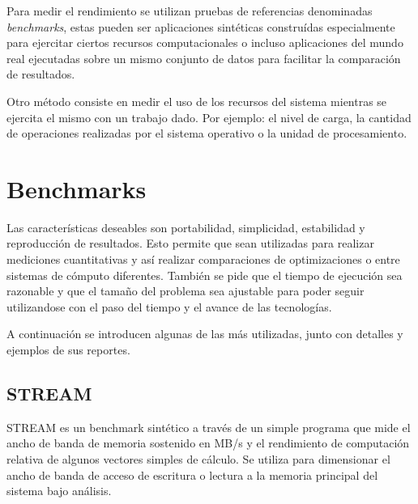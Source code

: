 \documentclass[a4paper]{report}
\begin{document}
Para medir el rendimiento se utilizan pruebas de referencias denominadas {\em benchmarks},
estas pueden ser aplicaciones sint\'eticas constru\'idas especialmente para ejercitar
ciertos recursos computacionales o incluso aplicaciones del mundo real ejecutadas sobre
un mismo conjunto de datos para facilitar la comparaci\'on de resultados.

\bigskip

Otro m\'etodo consiste en medir el uso de los recursos del sistema mientras se ejercita el mismo
con un trabajo dado. Por ejemplo: el nivel de carga, la cantidad de operaciones realizadas
por el sistema operativo o la unidad de procesamiento.

\section{Benchmarks}

Las caracter\'isticas deseables son portabilidad, simplicidad, estabilidad y reproducci\'on de resultados.
Esto permite que sean utilizadas para realizar mediciones cuantitativas y as\'i realizar comparaciones de
optimizaciones o entre sistemas de c\'omputo diferentes.
Tambi\'en se pide que el tiempo de ejecuci\'on sea razonable y que el tama\~no del problema sea ajustable para poder
seguir utilizandose con el paso del tiempo y el avance de las tecnolog\'ias.

\bigskip

A continuaci\'on se introducen algunas de las m\'as utilizadas, junto con detalles y ejemplos de sus reportes.

\subsection{STREAM}

STREAM \cite{stream} es un benchmark sint\'etico a trav\'es de un simple programa que mide el ancho de banda de
memoria sostenido en MB/s y el rendimiento de computaci\'on relativa de algunos vectores simples de c\'alculo.
Se utiliza para dimensionar el ancho de banda de acceso de escritura o lectura a la memoria principal del sistema
bajo an\'alisis.
\end{document}
